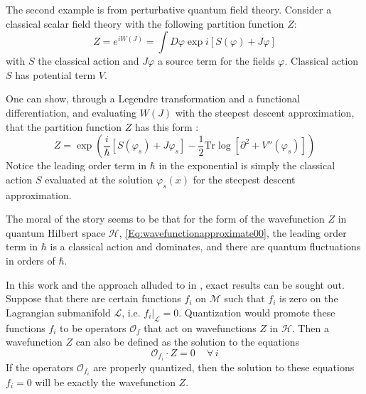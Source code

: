 \documentclass[a4paper,titlepage,twoside]{book}
\begin{document}
The second example is from perturbative quantum field theory.  Consider a classical scalar field theory with the following partition function $Z$:
\begin{equation}
Z = e^{i W{ (J)} } = \int D\varphi \exp{ i \left[ S(\varphi) + J\varphi \right] }
\end{equation}
with $S$ the classical action and $J\varphi$ a source term for the fields $\varphi$.   Classical action $S$ has potential term $V$.

One can show, through a Legendre transformation and a functional differentiation, and evaluating $W(J)$ with the steepest descent approximation, that the partition function $Z$ has this form \cite{Zee2010}:
\begin{equation}
Z = \exp{   \left( \frac{i}{ \hbar} \left[ S(\varphi_s) + J\varphi_s \right]  - \frac{1}{2} \text{Tr}{ \log{ \left[ \partial^2 + V''{ ( \varphi_s) } \right] } } \right)  } \label{Eq:ZQFT_steepest}
\end{equation}
Notice the leading order term in $\hbar$ in the exponential is simply the classical action $S$ evaluated at the solution $\varphi_s(x)$ for the steepest descent approximation.  

The moral of the story seems to be that for the form of the wavefunction $Z$ in quantum Hilbert space $\mathcal{H}$, \eqref{Eq:wavefunctionapproximate00}, the leading order term in $\hbar$ is a classical action and dominates, and there are quantum fluctuations in orders of $\hbar$.  


In this work and the approach alluded to in \cite{DimofteGukov2010}, exact results can be sought out.  Suppose that there are certain functions $f_i$ on $\mathcal{M}$ such that $f_i$ is zero on the Lagrangian submanifold $\mathcal{L}$, i.e. $\left. f_i \right|_{\mathcal{L}}=0$.  Quantization would promote these functions $f_i$ to be operators $\mathcal{O}_f$ that act on wavefunctions $Z$ in $\mathcal{H}$.  Then a wavefunction $Z$ can also be defined as the solution to the equations
\begin{equation}
  \mathcal{O}_{f_i} \cdot Z = 0 \quad \, \forall \, i  \label{Eq:quantizationexact}
\end{equation}
If the operators $\mathcal{O}_{f_i}$ are properly quantized, then the solution to these equations $f_i=0$ will be exactly the wavefunction $Z$.  
\end{document}
